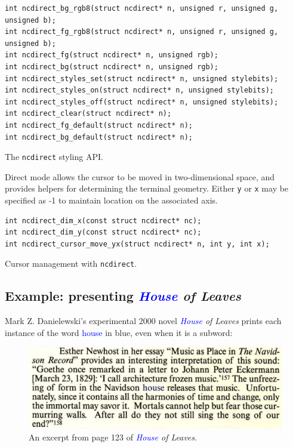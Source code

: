 \documentclass[letterpaper,10pt]{article}
\begin{document}
\begin{listing}[!htbp]
\begin{verbatim}
int ncdirect_bg_rgb8(struct ncdirect* n, unsigned r, unsigned g, unsigned b);
int ncdirect_fg_rgb8(struct ncdirect* n, unsigned r, unsigned g, unsigned b);
int ncdirect_fg(struct ncdirect* n, unsigned rgb);
int ncdirect_bg(struct ncdirect* n, unsigned rgb);
int ncdirect_styles_set(struct ncdirect* n, unsigned stylebits);
int ncdirect_styles_on(struct ncdirect* n, unsigned stylebits);
int ncdirect_styles_off(struct ncdirect* n, unsigned stylebits);
int ncdirect_clear(struct ncdirect* n);
int ncdirect_fg_default(struct ncdirect* n);
int ncdirect_bg_default(struct ncdirect* n);
\end{verbatim}
\caption{The \texttt{ncdirect} styling API.}
\end{listing}

Direct mode allows the cursor to be moved in two-dimensional space, and
provides helpers for determining the terminal geometry. Either \texttt{y} or
\texttt{x} may be specified as -1 to maintain location on the associated axis.

\begin{listing}[!htbp]
\begin{verbatim}
int ncdirect_dim_x(const struct ncdirect* nc);
int ncdirect_dim_y(const struct ncdirect* nc);
int ncdirect_cursor_move_yx(struct ncdirect* n, int y, int x);
\end{verbatim}
\caption{Cursor management with \texttt{ncdirect}.}
\end{listing}

\subsection{Example: presenting \textit{\textcolor{blue}{House} of Leaves}}
Mark Z. Danielewski's experimental 2000 novel \textit{\textcolor{blue}{House} of Leaves}\cite{danielewski2000house} prints each
instance of the word \textcolor{blue}{house} in blue, even when it is a subword:

\begin{figure}[!htbp]
\centering \includegraphics[width=.5\linewidth]{house-blue.png}
\caption{An excerpt from page 123 of \textit{\textcolor{blue}{House} of Leaves}.}
\label{fig:houseofleaves}
\end{figure}
\end{document}
